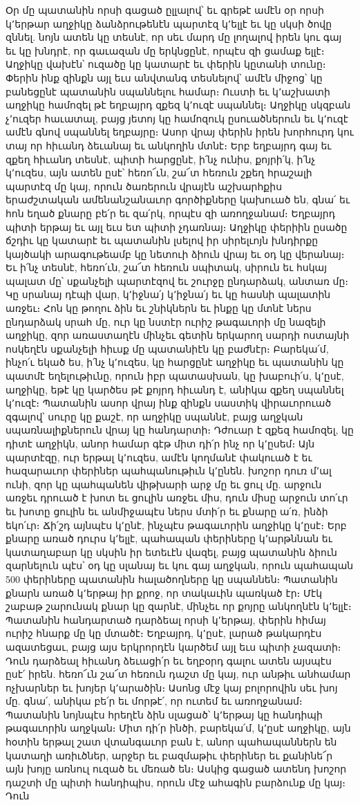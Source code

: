 \documentclass{article}
\begin{document}
{Օր մը պատանին որսի գացած ըլլալով՝ եւ գրեթէ ամէն օր որսի կ՚երթար աղջիկը ձանձրութենէն պարտէզ կ՚ելլէ եւ կը սկսի ծովը զննել. նոյն ատեն կը տեսնէ, որ սեւ մարդ մը լողալով իրեն կու գայ եւ կը խնդրէ, որ գաւազան մը երկնցընէ, որպէս զի ցամաք ելլէ։ Աղջիկը վախէն՝ ուզածը կը կատարէ եւ փերին կըտանի տունը։ Փերին ինք զինքն այլ եւս անվտանգ տեսնելով՝ ամէն միջոց՝ կը բանեցընէ պատանին սպաննելու համար։ Ուստի եւ կ՚աշխատի աղջիկը համոզել թէ եղբայրդ զքեզ կ՚ուզէ սպաննել։ Աղջիկը սկզբան չ՚ուզեր հաւատալ, բայց յետոյ կը համոզուկ ըսուածներուն եւ կ՚ուզէ ամէն գնով սպաննել եղբայրը։ Ասոր վրայ փերին իրեն խորհուրդ կու տայ որ հիւանդ ձեւանայ եւ անկողին մտնէ։ Երբ եղբայրդ գայ եւ զքեղ հիւանդ տեսնէ, պիտի հարցընէ, ի՛նչ ունիս, քոյրի՛կ, ի՛նչ կ՚ուզես, այն ատեն ըսէ՝ հեռո՜ւն, շա՜տ հեռուն շքեղ հրաշալի պարտէզ մը կայ, որուն ծառերուն վրայէն աշխարհքիս երաժշտական ամենանշանաւոր գործիքները կախուած են, գնա՛ եւ հոն եղած քնարը բե՛ր եւ զա՛րկ, որպէս զի առողջանամ։ Եղբայրդ պիտի երթայ եւ այլ եւս ետ պիտի չդառնայ։ Աղջիկը փերիին ըսածը ճշդիւ կը կատարէ եւ պատանին լսելով իր սիրելւոյն խնդիրքը կայծակի արագութեամբ կը նետուի ձիուն վրայ եւ օդ կը վերանայ։ Եւ ի՛նչ տեսնէ, հեռո՛ւն, շա՜տ հեռուն սպիտակ, սիրուն եւ հսկայ պալատ մը՝ սքանչելի պարտէզով եւ շուրջը ընդարձակ, անտառ մը։ Կը սրանայ դէպի վար, կ՚իջնա՛յ կ՚իջնա՛յ եւ կը հասնի պալատին առջեւ։ Հոն կը թողու ձին եւ շնիկներն եւ ինքը կը մտնէ ներս ընդարձակ սրահ մը, ուր կը նստէր ուրիշ թագաւորի մը նազելի աղջիկը, զոր առաստաղէն մինչեւ գետին երկարող սարդի ոստայնի ոսկեղէն սքանչելի հիւսք մը պատանիէն կը բաժնէր։ Բարեկա՛մ, ինչո՛ւ եկած ես, ի՛նչ կ՚ուզես, կը հարցընէ աղջիկը եւ պատանին կը պատմէ եղելութիւնը, որուն իբր պատասխան, կը խաբուի՛ս, կ՚ըսէ, աղջիկը, եթէ կը կարծես թէ քոյրդ հիւանդ է, անիկա զքեղ սպաննել կ՚ուզէ։ Պատանին ասոր վրայ ինք զինքն սաստիկ վիրաւորուած զգալով՝ սուրը կը քաշէ, որ աղջիկը սպաննէ, բայց աղջկան սպառնալիքներուն վրայ կը հանդարտի։ Դժուար է զքեզ համոզել, կը դիտէ աղջիկն, անոր համար գէթ միտ դի՛ր ինչ որ կ՚ըսեմ։ Այն պարտէզը, ուր երթալ կ՚ուզես, ամէն կողմանէ փակուած է եւ հազարաւոր փերիներ պահպանութիւն կ՚ընեն. խոշոր դուռ մ՚ալ ունի, զոր կը պահպանեն վիթխարի արջ մը եւ ցուլ մը. արջուն առջեւ դրուած է խոտ եւ ցուլին առջեւ միս, դուն միսը արջուն տո՛ւր եւ խոտը ցուլին եւ անմիջապէս ներս մտի՛ր եւ քնարը ա՛ռ, ինձի եկո՛ւր։ Ճի՛շդ այնպէս կ՚ընէ, ինչպէս թագաւորին աղջիկը կ՚ըսէ։ Երբ քնարը առած դուրս կ՚ելլէ, պահապան փերիները կ՚արթննան եւ կատաղաբար կը սկսին իր ետեւէն վազել, բայց պատանին ձիուն զարնելուն պէս՝ օդ կը սլանայ եւ կու գայ աղջկան, որուն պահապան 500 փերիները պատանին հալածողները կը սպաննեն։ Պատանին քնարն առած կ՚երթայ իր քրոջ, որ տակաւին պառկած էր։ Մէկ շաբաթ շարունակ քնար կը զարնէ, մինչեւ որ քոյրը անկողնէն կ՚ելլէ։ Պատանին հանդարտած դարձեալ որսի կ՚երթայ, փերին հիմայ ուրիշ հնարք մը կը մտածէ։ Եղբայրդ, կ՚ըսէ, լարած թակարդէս ազատեցաւ, բայց այս երկրորդէն կարծեմ այլ եւս պիտի չազատի։ Դուն դարձեալ հիւանդ ձեւացի՛ր եւ եղբօրդ գալու ատեն այսպէս ըսէ՛ իրեն. հեռո՜ւն շա՜տ հեռուն դաշտ մը կայ, ուր անթիւ անհամար ոչխարներ եւ խոյեր կ՚արածին։ Ասոնց մէջ կայ բոլորովին սեւ խոյ մը. գնա՛, անիկա բե՛ր եւ մորթէ՛, որ ուտեմ եւ առողջանամ։ Պատանին նոյնպէս հրեղէն ձին սլացած՝ կ՚երթայ կը հանդիպի թագաւորին աղջկան։ Միտ դի՛ր ինծի, բարեկա՛մ, կ՚ըսէ աղջիկը, այն հօտին երթալ շատ վտանգաւոր բան է, անոր պահապաններն են կատաղի առիւծներ, արջեր եւ բազմաթիւ փերիներ եւ քանինե՜ր այն խոյը առնուլ ուզած եւ մեռած են։ Ասկից գացած ատենդ խոշոր դաշտի մը պիտի հանդիպիս, որուն մէջ ահագին բարձունք մը կայ։ Դուն }
\end{document}
